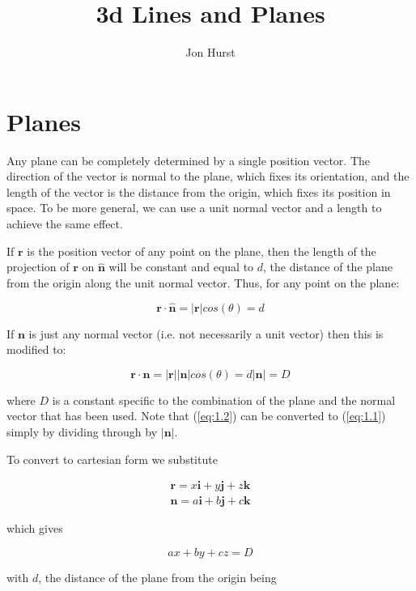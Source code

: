 \documentclass[a5paper]{article}
\title{3d Lines and Planes}
\author{Jon Hurst}
\begin{document}
\maketitle
\section{Planes}

Any plane can be completely determined by a single position vector. The
direction of the vector is normal to the plane, which fixes its orientation, and
the length of the vector is the distance from the origin, which fixes its
position in space. To be more general, we can use a unit normal vector and a
length to achieve the same effect.

If $\bm{r}$ is the position vector of any point on the plane, then the length of
the projection of $\bm{r}$ on $\bm{\hat{n}}$ will be constant and equal to $d$,
the distance of the plane from the origin along the unit normal vector. Thus,
for any point on the plane:

\begin{equation}
  \bm{r} \cdot \bm{\hat{n}} = |\bm{r}|cos(\theta) = d \label{eq:1.1}
\end{equation}

If $\bm{n}$ is just any normal vector (i.e. not necessarily a unit vector) then
this is modified to:

\begin{equation}
  \bm{r} \cdot \bm{n} = |\bm{r}||\bm{n}|cos(\theta) = d|\bm{n}| = D \label{eq:1.2}
\end{equation}

where $D$ is a constant specific to the combination of the plane and the normal
vector that has been used. Note that (\ref{eq:1.2}) can be converted to
(\ref{eq:1.1}) simply by dividing through by $|\bm{n}|$.

To convert to cartesian form we substitute

\begin{eqnarray}
  \bm{r} = x\bm{i} + y\bm{j} + z\bm{k} \\
  \bm{n} = a\bm{i} + b\bm{j} + c\bm{k}
\end{eqnarray}

which gives

\begin{equation}
  ax + by + cz = D
\end{equation}

with $d$, the distance of the plane from the origin being
\end{document}
